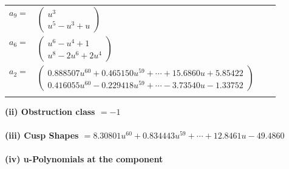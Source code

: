 \documentclass[1p]{elsarticle_modified}
\theoremstyle{definition}
\begin{document}
\begin{tabular}{m{7pt} m{180pt} m{7pt} m{180pt} }
\flushright $a_{9}=$&$\begin{pmatrix}u^3\\u^5- u^3+u\end{pmatrix}$ \\
\flushright $a_{6}=$&$\begin{pmatrix}u^6- u^4+1\\u^8-2 u^6+2 u^4\end{pmatrix}$ \\
\flushright $a_{2}=$&$\begin{pmatrix}0.888507 u^{60}+0.465150 u^{59}+\cdots+15.6860 u+5.85422\\0.416055 u^{60}-0.229418 u^{59}+\cdots-3.73540 u-1.33752\end{pmatrix}$\\&\end{tabular}
\flushleft \textbf{(ii) Obstruction class $= -1$}\\~\\
\flushleft \textbf{(iii) Cusp Shapes $= 8.30801 u^{60}+0.834443 u^{59}+\cdots+12.8461 u-49.4860$}\\~\\
\newpage\renewcommand{\arraystretch}{1}
\flushleft \textbf{(iv) u-Polynomials at the component}\newline \\
\end{document}
